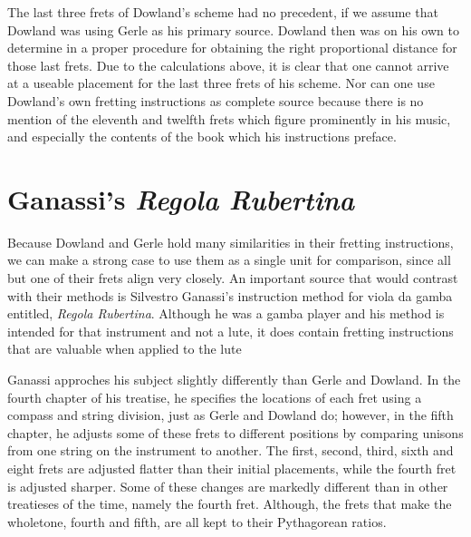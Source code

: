 The last three frets of Dowland's scheme had no precedent, if we assume that Dowland
was using Gerle as his primary source.  Dowland then was on his own to determine in a
proper procedure for obtaining the right proportional distance for those last frets.
Due to the calculations above, it is clear that one cannot arrive at a useable
placement for the last three frets of his scheme. Nor can one use Dowland's own
fretting instructions as complete source because there is no mention of the eleventh
and twelfth frets which figure prominently in his music, and especially the contents of
the book which his instructions preface.

\section{Ganassi's \textit{Regola Rubertina}}

Because Dowland and Gerle hold many similarities in their fretting instructions, we can
make a strong case to use them as a single unit for comparison, since all but one of
their frets align very closely.  An important source that would contrast with their
methods is Silvestro Ganassi's instruction method for viola da gamba entitled,
\textit{Regola Rubertina}. Although he was a gamba player and his method is intended
for that instrument and not a lute, it does contain fretting instructions that are
valuable when applied to the lute

Ganassi approches his subject slightly differently than Gerle and Dowland.  In the
fourth chapter of his treatise, he specifies the locations of each fret using a compass
and string division, just as Gerle and Dowland do; however, in the fifth chapter, he
adjusts some of these frets to different positions by comparing unisons from one string
on the instrument to another.  The first, second, third, sixth and eight frets are
adjusted flatter than their initial placements, while the fourth fret is adjusted
sharper.  Some of these changes are markedly different than in other treatieses of the
time, namely the fourth fret.  Although, the frets that make the wholetone, fourth and
fifth, are all kept to their Pythagorean ratios.

